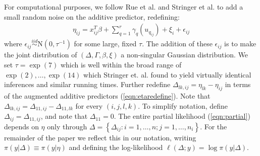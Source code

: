 \documentclass[AMA,STIX1COL,doublespace]{WileyNJD-v2}
\begin{document}
For computational purposes, we follow Rue et al. \cite{inla} and Stringer et al. \cite{casecross} to add a small random noise on the additive predictor, redefining: 
\begin{equation}\begin{aligned}\label{eqn:etaredefine}
\eta_{ij} =x_{ij}^{T}\beta+\sum_{q=1}^{r} \gamma_q(u_{q_{ij}}) +\xi_{i} + \epsilon_{ij}
\end{aligned}\end{equation}
where $\epsilon_{ij} \stackrel{iid}{\sim} \text{N}(0,\tau^{-1})$ for some large, fixed $\tau$. The addition of these $\epsilon_{ij}$ is to make the joint distribution of $\left(\Delta, \Gamma,\beta, \xi \right)$ a non-singular Gaussian distribution. We set $\tau = \exp(7)$ which is well within the broad range of $\exp(2),\ldots,\exp(14)$ which Stringer et. al. \cite{casecross} found to yield virtually identical inferences and similar running times. Further redefine $\Delta_{lk,ij} = \eta_{lk} - \eta_{ij}$ in terms of the augmented additive predictors (\ref{eqn:etaredefine}). Note that $\Delta_{lk,ij} = \Delta_{11,ij} - \Delta_{11,lk}$ for every $(i,j,l,k)$. To simplify notation, define $\Delta_{ij} = \Delta_{11,ij}$, and note that $\Delta_{11} = 0$. The entire partial likelihood (\ref{eqn:partial}) depends on $\eta$ only through  $\Delta = \left\{\Delta_{ij}: i = 1,\ldots,n; j = 1,\ldots,n_{i} \right\}$. For the remainder of the paper we reflect this in our notation, writing $\pi(y|\Delta) \equiv \pi(y|\eta)$ and defining the log-likelihood $\ell(\Delta; y) = \log\pi(y|\Delta)$.
\end{document}
